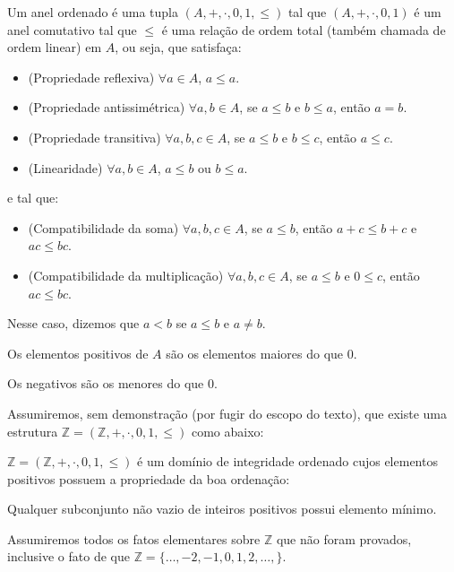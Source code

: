 \begin{definition}
    Um anel ordenado é uma tupla $(A, +, \cdot, 0, 1, \leq)$ tal que $(A, +, \cdot, 0, 1)$ é um anel comutativo tal que $\leq$ é uma relação de ordem total (também chamada de ordem linear) em $A$, ou seja, que satisfaça:

    \begin{itemize}
        \item (Propriedade reflexiva) $\forall a \in A$, $a \leq a$.
        \item (Propriedade antissimétrica) $\forall a, b \in A$, se $a \leq b$ e $b \leq a$, então $a=b$.
        \item (Propriedade transitiva) $\forall a, b, c \in A$, se $a \leq b$ e $b \leq c$, então $a \leq c$.
        \item (Linearidade) $\forall a, b \in A$, $a \leq b$ ou $b \leq a$.
    \end{itemize}

    e tal que:

    \begin{itemize}
        \item (Compatibilidade da soma) $\forall a, b, c \in A$, se $a \leq b$, então $a+c \leq b+c$ e $ac \leq bc$.
        \item (Compatibilidade da multiplicação) $\forall a, b, c \in A$, se $a \leq b$ e $0 \leq c$, então $ac \leq bc$.
    \end{itemize}

    Nesse caso, dizemos que $a<b$ se $a\leq b$ e $a\neq b$.
    
    Os elementos positivos de $A$ são os elementos maiores do que $0$.
    
    Os negativos são os menores do que $0$.
\end{definition}

Assumiremos, sem demonstração (por fugir do escopo do texto), que existe uma estrutura $\mathbb Z=(\mathbb Z,+,\cdot,0,1, \leq)$ como abaixo:

\begin{definition}
$\mathbb Z=(\mathbb Z,+,\cdot,0,1, \leq)$ é um domínio de integridade ordenado cujos elementos positivos possuem a propriedade da boa ordenação:

Qualquer subconjunto não vazio de inteiros positivos possui elemento mínimo.
\end{definition}

Assumiremos todos os fatos elementares sobre $\mathbb Z$ que não foram provados, inclusive o fato de que $\mathbb Z=\{\dots, -2, -1, 0, 1, 2, \dots, \}$.
